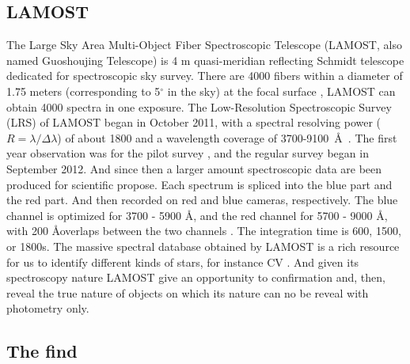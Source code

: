 \documentclass[fleqn,usenatbib]{mnras}
\begin{document}
\subsection{LAMOST}
\label{sec:lamost}

The Large Sky Area Multi-Object Fiber Spectroscopic Telescope
(LAMOST, also named Guoshoujing Telescope) is 4 m quasi-meridian reflecting
Schmidt telescope dedicated for spectroscopic sky survey.
There are 4000 fibers within a diameter of 1.75 meters (corresponding
to 5$^{\circ}$ in the sky) at the focal surface \citep{Cui:2012}, LAMOST can
obtain 4000 spectra in one exposure.
The Low-Resolution Spectroscopic Survey (LRS) of LAMOST
began in October 2011, with a spectral resolving power ($R = \lambda/\Delta\lambda$)
of about 1800 and a wavelength coverage of
3700-9100~\AA~\citep{Zhao:2012}. The first year observation was
for the pilot survey \citep{Luo:2012, Zhao:2012},
and the regular survey began in September 2012. And since then
a larger amount  spectroscopic data are been produced for
scientific propose. Each spectrum is spliced into the blue part and the red part.
And then recorded on red and blue cameras, respectively.
The blue channel is optimized for 3700 - 5900  \AA, and the red channel for
5700 - 9000  \AA, with 200 \AA overlaps between the two channels \citep{Yao:2019}.
The integration time is 600, 1500, or 1800s. The massive spectral
database obtained by LAMOST is a rich resource for us to identify
different kinds of stars, for instance CV \citep{Sun:2021}. And given
its spectroscopy nature LAMOST give an opportunity to confirmation and, then,
reveal the true nature of objects on which its nature
can no be reveal with photometry only.

\subsection{The find}
\label{sec:find}
\end{document}
